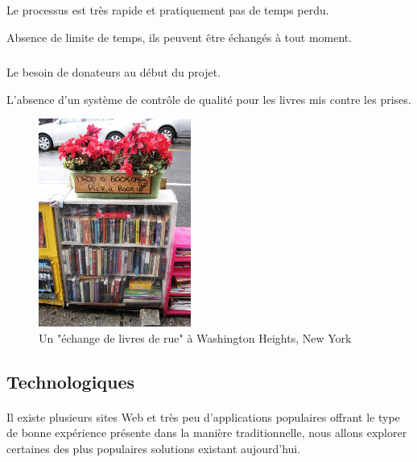 \subparagraph*{}
\begin{list}{•}{\textbf{Avantages}}
	\item Le processus est très rapide et pratiquement pas de temps perdu.
	\item Absence de limite de temps, ils peuvent être échangés à tout moment.
\end{list}

\subparagraph*{}
\begin{list}{•}{\textbf{Inconvénients}}
	\item Le besoin de donateurs au début du projet.
	\item L'absence d'un système de contrôle de qualité pour les livres mis contre les prises.
\end{list}

\begin{figure}[h]
	\begin{center}
		\includegraphics[width=5cm]{Images/chapter1/bookswapSpot.jpg}
		\caption{{\footnotesize Un "échange de livres de rue" à Washington Heights, New York\cite{noauthor_book_2019}}}
	\end{center}
\end{figure}

\newpage

\subsection{Technologiques}

\paragraph*{}
Il existe plusieurs sites Web et très peu d'applications populaires offrant le type de bonne expérience présente dans la manière traditionnelle, nous allons explorer certaines des plus populaires solutions existant aujourd’hui.\\

